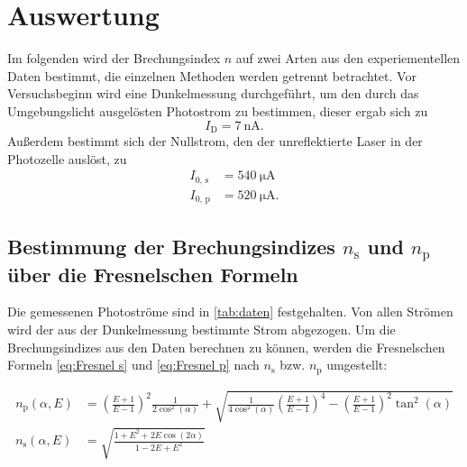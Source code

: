 \section{Auswertung}
\label{sec:Auswertung}

Im folgenden wird der Brechungsindex $n$ auf zwei Arten aus den experiementellen Daten bestimmt,
die einzelnen Methoden werden getrennt betrachtet.
Vor Versuchsbeginn wird eine Dunkelmessung durchgeführt, um den durch das Umgebungslicht ausgelösten Photostrom
zu bestimmen, dieser ergab sich zu
\begin{equation*}
    I_{\text{D}}=\qty{7}{\nano\ampere}.
\end{equation*}
Außerdem bestimmt sich der Nullstrom, den der unreflektierte Laser in der Photozelle auslöst, zu
\begin{align*}
    I_{\text{0, s}}&=\qty{540}{\micro\ampere} \\
    I_{\text{0, p}}&=\qty{520}{\micro\ampere}.
\end{align*}

\subsection{Bestimmung der Brechungsindizes $n_{\text{s}}$ und $n_{\text{p}}$ über die Fresnelschen Formeln}
\label{sec:fresnel}

Die gemessenen Photoströme sind in \autoref{tab:daten} festgehalten.
Von allen Strömen wird der aus der Dunkelmessung bestimmte Strom abgezogen.
Um die Brechungsindizes aus den Daten berechnen zu können, werden die Fresnelschen Formeln
\eqref{eq:Fresnel s} und \eqref{eq:Fresnel p} nach $n_{\text{s}}$ bzw. $n_{\text{p}}$ umgestellt:

\begin{align}
    n_\text{p}(\alpha, E) &= \left(\frac{E + 1}{E - 1}\right)^2 \frac{1}{2\cos^2(\alpha)} + \sqrt{\frac{1}{4\cos^2(\alpha)}\left(\frac{E + 1}{E - 1}\right)^4 - \left(\frac{E + 1}{E - 1}\right)^2\tan^2(\alpha)} \label{eq:n_s} \\
    n_\text{s}(\alpha, E) &= \sqrt{\frac{1 + E^2 + 2E\cos(2\alpha)}{1 - 2E + E^2}} \label{eq:n_p}
\end{align}

